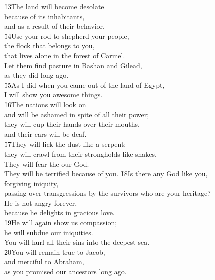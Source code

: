 \begin{poetry}
\poeml \v{13}The land will become desolate \\
\poemll    because of its inhabitants, \\
\poemlll       and as a result of their behavior. \\
\poeml \v{14}Use your rod to shepherd your people, \\
\poemll    the flock that belongs to you, \\
\poemlll       that lives alone in the forest of Carmel. \\
\poeml Let them find pasture in Bashan and Gilead, \\
\poemll    as they did long ago. \\
\poeml \v{15}As I did when you came out of the land of Egypt, \\
\poemll    I will show you awesome things. \\
\poeml \v{16}The nations will look on \\
\poemll    and will be ashamed in spite of all their power; \\
\poeml they will cup their hands over their mouths, \\
\poemll    and their ears will be deaf. \\
\poeml \v{17}They will lick the dust like a serpent; \\
\poemll    they will crawl from their strongholds like snakes. \\
\poeml They will fear the  our God. \\
\poemll    They will be terrified because of you.
\poeml \v{18}Is there any God like you, \\
\poemll    forgiving iniquity, \\
\poemlll       passing over transgressions by the survivors who are your heritage? \\
\poeml He is not angry forever, \\
\poemll    because he delights in gracious love. \\
\poeml \v{19}He will again show us compassion; \\
\poemll    he will subdue our iniquities. \\
\poeml You will hurl all their sins into the deepest sea. \\
\poeml \v{20}You will remain true to Jacob, \\
\poemll    and merciful to Abraham, \\
\poeml as you promised our ancestors long ago.\end{poetry}
